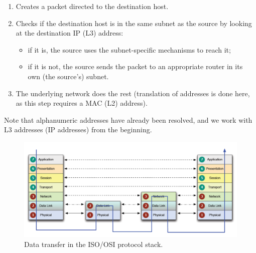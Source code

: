 \begin{enumerate}
    \item Creates a packet directed to the destination host.
    \item Checks if the destination host is in the same subnet as the source by looking at the destination IP (L3) address:
    \begin{itemize}
        \item if it is, the source uses the subnet-specific mechanisms to reach it;
        \item if it is not, the source sends the packet to an appropriate router in its own (the source's) subnet.
    \end{itemize}
    \item The underlying network does the rest (translation of addresses is done here, as this step requires a MAC (L2) address).
\end{enumerate}

Note that alphanumeric addresses have already been resolved, and we work with L3 addresses (IP addresses) from the beginning.

\begin{figure}[H]
    \centering
    \includegraphics[scale=0.5]{img/data_transfer.png}
    \decoRule
    \caption{Data transfer in the ISO/OSI protocol stack.}
    \label{fig:data_transfer}
\end{figure}